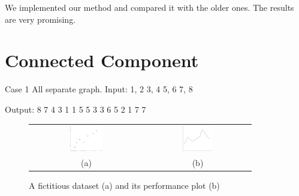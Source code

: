 We implemented our method
and compared it with the older ones.
The results are very promising.

\section{Connected Component}
\begin{itemize*}
\item {Case 1 All separate graph.}
Input:
1, 2
3, 4
5, 6
7, 8

Output:
8	7
4	3
1	1
5	5
3	3
6	5
2	1
7	7
\end{itemize*}


\begin{figure}[htbf]
\begin{center}
\begin{tabular}{cc}
     \includegraphics[width=0.3\textwidth]{FIG/data.png} &
     \includegraphics[width=0.3\textwidth]{FIG/plot.png} \\
    (a) & (b) 
\end{tabular}
\caption{A fictitious dataset (a) and its performance plot (b)}
\label{fig:results}
\end{center}
\end{figure}

